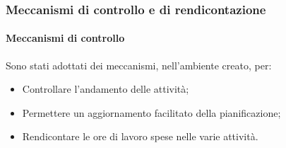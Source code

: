 \newpage
\subsubsection{Meccanismi di controllo e di rendicontazione}
	\paragraph{Meccanismi di controllo} Sono stati adottati dei meccanismi, nell'ambiente creato, per:
	\begin{itemize}
		\item Controllare l'andamento delle attività;
		\item Permettere un aggiornamento facilitato della pianificazione;
		\item Rendicontare le ore di lavoro spese nelle varie attività.
	\end{itemize}
